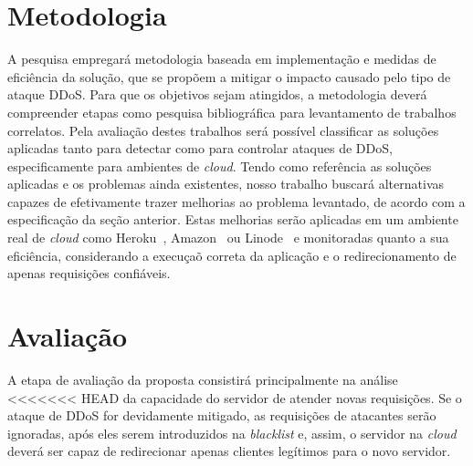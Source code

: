 \documentclass[a4paper, 11pt]{article}
\begin{document}
\section{Metodologia}
A pesquisa empregar\'a metodologia baseada em implementa\c{c}\~{a}o e medidas de
efici\^encia da solu\c{c}\~{a}o, que se propõem a mitigar o impacto causado pelo
tipo de ataque DDoS. Para que os objetivos sejam atingidos, a metodologia
dever\'a
compreender etapas como pesquisa bibliogr\'afica para levantamento de trabalhos
correlatos. Pela avalia\c{c}\~{a}o destes trabalhos ser\'a poss\'ivel
classificar as
solu\c{c}\~oes aplicadas tanto para detectar como para controlar ataques de
DDoS,
especificamente para ambientes de \emph{cloud}. Tendo como refer\^encia as
solu\c{c}\~oes aplicadas e os problemas ainda existentes, nosso trabalho
buscar\'a
alternativas capazes de efetivamente trazer melhorias ao problema levantado,
de acordo com a especificação da seção anterior.
Estas melhorias ser\~ao aplicadas em um ambiente real de \emph{cloud} como
Heroku~\cite{heroku}, Amazon~\cite{amazon}
ou Linode~\cite{linode} e monitoradas quanto a sua efici\^encia, considerando a
execu\c{c}a\~o correta da aplica\c{c}\~{a}o e o redirecionamento de apenas
requisições
confi\'aveis.





\section{Avalia\c{c}\~{a}o}
A etapa de avalia\c{c}\~{a}o da proposta consistirá principalmente na análise
<<<<<<< HEAD
da capacidade do servidor de atender novas requisições. Se o ataque de DDoS for
devidamente
mitigado, as requisições de atacantes serão ignoradas, após eles serem
introduzidos na \emph{blacklist}
e, assim, o servidor na \emph{cloud} deverá ser capaz de redirecionar apenas
clientes legítimos
para o novo servidor.
\end{document}

